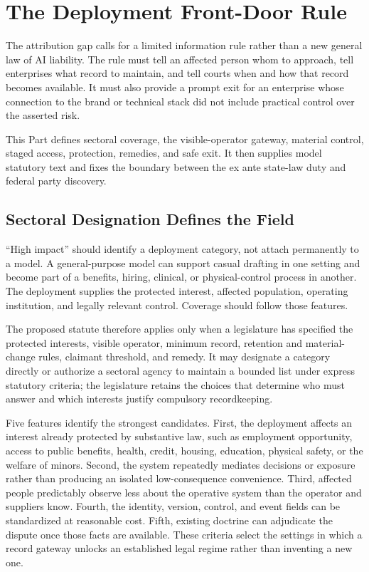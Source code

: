 \section{The Deployment Front-Door Rule}
\label{sec:rule}

The attribution gap calls for a limited information rule rather than a new general law of AI liability. The rule must tell an affected person whom to approach, tell enterprises what record to maintain, and tell courts when and how that record becomes available. It must also provide a prompt exit for an enterprise whose connection to the brand or technical stack did not include practical control over the asserted risk.

This Part defines sectoral coverage, the visible-operator gateway, material control, staged access, protection, remedies, and safe exit. It then supplies model statutory text and fixes the boundary between the ex ante state-law duty and federal party discovery.

\subsection{Sectoral Designation Defines the Field}
\label{sec:designation}

``High impact'' should identify a deployment category, not attach permanently to a model. A general-purpose model can support casual drafting in one setting and become part of a benefits, hiring, clinical, or physical-control process in another. The deployment supplies the protected interest, affected population, operating institution, and legally relevant control. Coverage should follow those features.

The proposed statute therefore applies only when a legislature has specified the protected interests, visible operator, minimum record, retention and material-change rules, claimant threshold, and remedy. It may designate a category directly or authorize a sectoral agency to maintain a bounded list under express statutory criteria; the legislature retains the choices that determine who must answer and which interests justify compulsory recordkeeping.

Five features identify the strongest candidates. First, the deployment affects an interest already protected by substantive law, such as employment opportunity, access to public benefits, health, credit, housing, education, physical safety, or the welfare of minors. Second, the system repeatedly mediates decisions or exposure rather than producing an isolated low-consequence convenience. Third, affected people predictably observe less about the operative system than the operator and suppliers know. Fourth, the identity, version, control, and event fields can be standardized at reasonable cost. Fifth, existing doctrine can adjudicate the dispute once those facts are available. These criteria select the settings in which a record gateway unlocks an established legal regime rather than inventing a new one.

